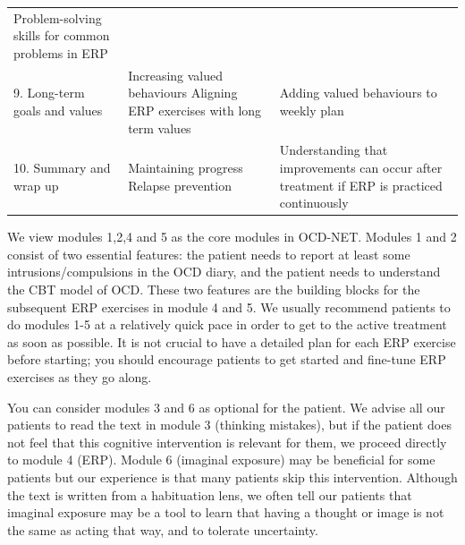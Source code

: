 \documentclass[]{book}
\begin{document}
\begin{longtable}[]{@{}lll@{}}
\begin{minipage}[t]{0.30\columnwidth}
Problem-solving skills for common problems in ERP\strut
\end{minipage}\tabularnewline
\begin{minipage}[t]{0.30\columnwidth}\raggedright
9. Long-term goals and values\strut
\end{minipage} & \begin{minipage}[t]{0.30\columnwidth}\raggedright
Increasing valued behaviours Aligning ERP exercises with long term values\strut
\end{minipage} & \begin{minipage}[t]{0.30\columnwidth}\raggedright
Adding valued behaviours to weekly plan\strut
\end{minipage}\tabularnewline
\begin{minipage}[t]{0.30\columnwidth}\raggedright
10. Summary and wrap up\strut
\end{minipage} & \begin{minipage}[t]{0.30\columnwidth}\raggedright
Maintaining progress Relapse prevention\strut
\end{minipage} & \begin{minipage}[t]{0.30\columnwidth}\raggedright
Understanding that improvements can occur after treatment if ERP is practiced continuously\strut
\end{minipage}\tabularnewline
\bottomrule
\end{longtable}

We view modules 1,2,4 and 5 as the core modules in OCD-NET. Modules 1 and 2 consist of two essential features: the patient needs to report at least some intrusions/compulsions in the OCD diary, and the patient needs to understand the CBT model of OCD. These two features are the building blocks for the subsequent ERP exercises in module 4 and 5. We usually recommend patients to do modules 1-5 at a relatively quick pace in order to get to the active treatment as soon as possible. It is not crucial to have a detailed plan for each ERP exercise before starting; you should encourage patients to get started and fine-tune ERP exercises as they go along.

You can consider modules 3 and 6 as optional for the patient. We advise all our patients to read the text in module 3 (thinking mistakes), but if the patient does not feel that this cognitive intervention is relevant for them, we proceed directly to module 4 (ERP). Module 6 (imaginal exposure) may be beneficial for some patients but our experience is that many patients skip this intervention. Although the text is written from a habituation lens, we often tell our patients that imaginal exposure may be a tool to learn that having a thought or image is not the same as acting that way, and to tolerate uncertainty.
\end{document}
